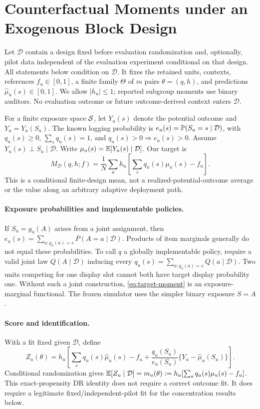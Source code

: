 \section{Counterfactual Moments under an Exogenous Block Design}
\label{sec:setup}
Let $\mathcal D$ contain a design fixed before evaluation randomization and, optionally, pilot data independent of the evaluation experiment conditional on that design. All statements below condition on $\mathcal D$. It fixes the retained units, contexts, references $f_u\in[0,1]$, a finite family $\Theta$ of $m$ pairs $\theta=(q,h)$, and predictions $\widehat\mu_u(s)\in[0,1]$. We allow $|h_u|\le1$; reported subgroup moments use binary auditors. No evaluation outcome or future outcome-derived context enters $\mathcal D$.

For a finite exposure space $\mathcal{S}$, let $Y_u(s)$ denote the potential outcome and $Y_u=Y_u(S_u)$. The known logging probability is $e_u(s)=\mathbb{P}(S_u=s\mid\mathcal D)$, with $q_u(s)\ge0$, $\sum_s q_u(s)=1$, and $q_u(s)>0\Rightarrow e_u(s)>0$. Assume $Y_u(s)\perp S_u\mid\mathcal D$. Write $\mu_u(s)=\mathbb{E}[Y_u(s)\mid\mathcal D]$. Our target is
\begin{equation}
 M_{\mathcal D}(q,h;f)=\frac1N\sum_u h_u\left[\sum_s q_u(s)\mu_u(s)-f_u\right].
 \label{eq:target-moment}
\end{equation}
This is a conditional finite-design mean, not a realized-potential-outcome average or the value along an arbitrary adaptive deployment path.

\paragraph{Exposure probabilities and implementable policies.}
If $S_u=g_u(A)$ arises from a joint assignment, then $e_u(s)=\sum_{a:g_u(a)=s}P(A=a\mid\mathcal D)$. Products of item marginals generally do not equal these probabilities. To call $q$ a globally implementable policy, require a valid joint law $Q(A\mid\mathcal D)$ inducing every $q_u(s)=\sum_{a:g_u(a)=s}Q(a\mid\mathcal D)$. Two units competing for one display slot cannot both have target display probability one. Without such a joint construction, \eqref{eq:target-moment} is an exposure-marginal functional. The frozen simulator uses the simpler binary exposure $S=A$.

\paragraph{Score and identification.}
With a fit fixed given $\mathcal D$, define
\begin{equation}
 Z_u(\theta)=h_u\left[\sum_s q_u(s)\widehat\mu_u(s)-f_u+
 \frac{q_u(S_u)}{e_u(S_u)}\{Y_u-\widehat\mu_u(S_u)\}\right].
 \label{eq:gate-a-score}
\end{equation}
Conditional randomization gives
$\mathbb{E}[Z_u\mid\mathcal D]=m_u(\theta):=h_u[\sum_s q_u(s)\mu_u(s)-f_u]$.
This exact-propensity DR identity does not require a correct outcome fit. It does require a legitimate fixed/independent-pilot fit for the concentration results below.

